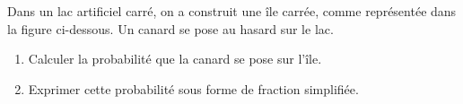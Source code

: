 Dans un lac artificiel carré, on a construit une île carrée, comme représentée dans la figure ci-dessous. Un canard se pose au hasard sur le lac.

\begin{center}
\end{center}

\begin{enumerate}
    \item Calculer la probabilité que la canard se pose sur l'île.
    \item Exprimer cette probabilité sous forme de fraction simplifiée.
\end{enumerate}